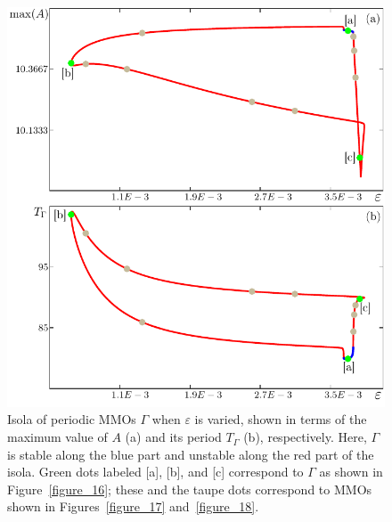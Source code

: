 \documentclass{ws-ijbc}
\begin{document}
\begin{figure}[t!]
\centering
\includegraphics[]{./figures/MKMO_15.pdf}
\caption{Isola of periodic MMOs $\Gamma$ when $\varepsilon$ is varied, shown in terms of the maximum value of $A$ (a) and its period $T_\Gamma$ (b), respectively.  Here, $\Gamma$ is stable along the blue part and unstable along the red part of the isola.  Green dots labeled [a], [b], and [c] correspond to $\Gamma$ as shown in Figure~\ref{figure_16}; these and the taupe dots correspond to MMOs shown in Figures~\ref{figure_17} and~\ref{figure_18}.}
\label{figure_15}
\end{figure}
\end{document}
